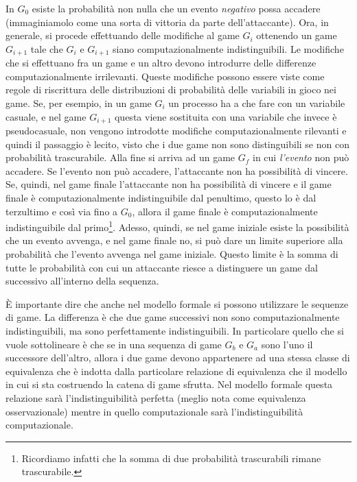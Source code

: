 \documentclass[a4paper,openright,twoside,12pt]{report}
\begin{document}
In $G_0$ esiste la probabilit\`a non nulla che un evento \emph{negativo} possa accadere (immaginiamolo come una sorta di vittoria da parte dell'attaccante).
Ora, in generale, si procede effettuando delle modifiche al game $G_i$ ottenendo un game $G_{i+1}$ 
tale che $G_i$ e $G_{i+1}$ siano computazionalmente indistinguibili. Le modifiche che si effettuano fra un game e un altro devono introdurre delle differenze computazionalmente irrilevanti.
Queste modifiche possono essere viste come regole di riscrittura delle distribuzioni di probabilit\`a delle variabili in gioco nei game.
Se, per esempio, in un game $G_i$ un processo ha a che fare con un variabile casuale, e nel game $G_{i+1}$ questa viene sostituita con una variabile che invece \`e pseudocasuale, non vengono introdotte
modifiche computazionalmente rilevanti e quindi il passaggio \`e lecito, visto che i due game non sono distinguibili se non con probabilit\`a trascurabile.
Alla fine si arriva ad un game $G_f$ in cui \emph{l'evento} non pu\`o accadere. Se l'evento non pu\`o accadere, l'attaccante non ha possibilit\`a di vincere. 
Se, quindi, nel game finale l'attaccante non ha possibilit\`a di vincere e il game finale
\`e computazionalmente indistinguibile dal penultimo, questo lo \`e dal terzultimo e cos\`i via fino a $G_0$, allora
il game finale \`e computazionalmente indistinguibile dal primo\footnote{Ricordiamo infatti che la somma di due probabilit\`a trascurabili rimane trascurabile.}. 
Adesso, quindi, se nel game iniziale esiste la possibilit\`a che un evento avvenga, e nel game finale no,
si pu\`o dare un limite superiore alla probabilit\`a che l'evento avvenga nel game iniziale. Questo limite \`e la somma di tutte le probabilit\`a con cui un attaccante riesce a distinguere un game dal successivo all'interno della sequenza.

\`E importante dire che anche nel modello formale si possono utilizzare le sequenze di game. La differenza \`e che due game successivi non sono computazionalmente indistinguibili, 
ma sono perfettamente indistinguibili. In particolare quello che si vuole sottolineare \`e che se in una sequenza di game $G_b$ e $G_a$ sono l'uno il successore dell'altro, 
allora i due game 
devono appartenere ad una stessa classe di equivalenza che \`e indotta dalla particolare relazione di equivalenza che il modello in cui si sta costruendo la catena di game sfrutta.
Nel modello formale questa relazione sar\`a l'indistinguibilit\`a perfetta (meglio nota come equivalenza osservazionale) mentre in quello computazionale sar\`a 
l'indistinguibilit\`a computazionale.
\end{document}
